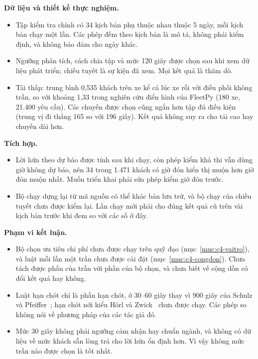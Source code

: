\textbf{Dữ liệu và thiết kế thực nghiệm.}
\begin{itemize}[leftmargin=1.2cm,itemsep=2pt,topsep=3pt]
\item Tập kiểm tra chính có 34 kịch bản phụ thuộc nhau thuộc 5 ngày, mỗi kịch bản chạy một lần. Các phép đếm theo
kịch bản là mô tả, không phải kiểm định, và không bảo đảm cho ngày khác.
\item Ngưỡng phân tích, cách chia tập và mức 120 giây được chọn sau khi xem dữ liệu phát triển; chiều tuyết là sự
kiện đã xem. Mọi kết quả là thăm dò.
\item Tải thấp: trung bình 0,535 khách trên xe kể cả lúc xe rỗi với điều phối không trần, so với khoảng 1,33 trong
nghiên cứu điển hình của FleetPy (180 xe, 21.400 yêu cầu). Các chuyến được chọn cũng ngắn hơn tập đủ điều kiện (trung
vị đi thẳng 165 so với 196 giây). Kết quả không suy ra cho tải cao hay chuyến dài hơn.
\end{itemize}

\textbf{Tích hợp.}
\begin{itemize}[leftmargin=1.2cm,itemsep=2pt,topsep=3pt]
\item Lời hứa theo dự báo được tính sau khi chạy, còn phép kiểm khả thi vẫn dùng giờ không dự báo, nên 34 trong 1.471
khách có giờ đón hiển thị muộn hơn giờ đón muộn nhất. Muốn triển khai phải sửa phép kiểm giờ đón trước.
\item Bộ chạy dựng lại từ mã nguồn có thể khác bản lưu trữ, và bộ chạy của chiều tuyết chưa được kiểm lại. Lần chạy
mới phải cho đúng kết quả cũ trên vài kịch bản trước khi đem so với các số ở đây.
\end{itemize}

\textbf{Phạm vi kết luận.}
\begin{itemize}[leftmargin=1.2cm,itemsep=2pt,topsep=3pt]
\item Bộ chọn ưu tiên chi phí chưa được chạy trên quỹ đạo (mục~\ref{muc:c4-vaitro}), và luật mỗi lần một trần chưa
được cài đặt (mục~\ref{muc:c4-congdon}). Chưa tách được phần của trần với phần của bộ chọn, và chưa biết vế cộng dồn
có đổi kết quả hay không.
\item Luật hạn chót chỉ là phần hạn chót, ở 30--60 giây thay vì 900 giây của Schulz và Pfeiffer~\cite{schulz2026};
hạn chót nới kiểu Hörl và Zwick~\cite{horl2022} chưa được chạy. Các phép so không nói về phương pháp của các tác giả
đó.
\item Mức 30 giây không phải ngưỡng cảm nhận hay chuẩn ngành, và không có dữ liệu về mức khách sẵn lòng trả cho lời
hứa ổn định hơn. Vì vậy không mức trần nào được chọn là tốt nhất.
\end{itemize}
